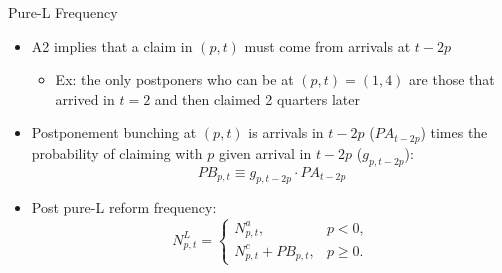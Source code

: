 \begin{frame}{Pure-L Frequency}
    \begin{itemize}
        \item A2 implies that a claim in $(p,t)$ must come from arrivals at $t-2p$
        \begin{itemize}
            \item Ex: the only postponers who can be at $(p,t)=(1,4)$ are those that arrived in $t=2$ and then claimed 2 quarters later
        \end{itemize}
        \item Postponement bunching at $(p,t)$ is arrivals in $t-2p$ ($PA_{t-2p}$) times the probability of claiming with $p$ given arrival in $t-2p$ ($g_{p,t-2p}$):
    \[
        PB_{p,t}\equiv g_{p,t-2p}\cdot PA_{t-2p}
    \]
    \item Post pure-L reform frequency:
    \[
        N^{L}_{p,t}=
        \begin{cases}
            N^{a}_{p,t}, & p<0,\\[3pt]
            N^{c}_{p,t}+PB_{p,t}, & p\ge 0.
        \end{cases}
    \]
\end{itemize}
\end{frame}

